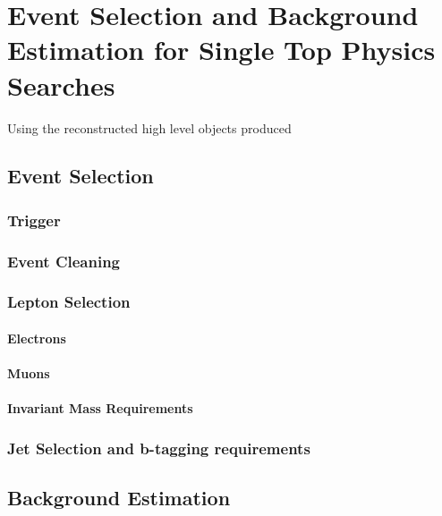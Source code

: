 \chapter{Event Selection and Background Estimation for Single Top Physics Searches}\label{chapter:tzq-search}
Using the reconstructed high level objects produced
\section{Event Selection}
\subsection{Trigger}
\subsection{Event Cleaning}
\subsection{Lepton Selection}
\subsubsection{Electrons}
\subsubsection{Muons}
\subsubsection{Invariant Mass Requirements}
\subsection{Jet Selection and b-tagging requirements}

\section{Background Estimation}
